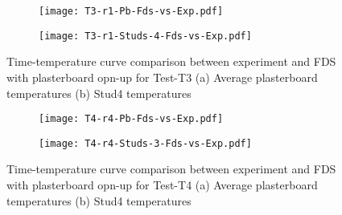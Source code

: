 \begin{figure}[!htbp]
	\centering
	\begin{subfigure}[b]{0.6\textwidth}
		\centering
		\texttt{[image: T3-r1-Pb-Fds-vs-Exp.pdf]}
		\caption{}
		\label{subfig:T3-r1-Pb-Fds-vs-Exp}
	\end{subfigure}
	\begin{subfigure}[b]{0.6\textwidth}
		\centering
		\texttt{[image: T3-r1-Studs-4-Fds-vs-Exp.pdf]}
		\caption{}
		\label{subfig:T3-r0-Studs-4-Fds-vs-Exp}
	\end{subfigure}
	   \caption{Time-temperature curve comparison between experiment and FDS with plasterboard opn-up for Test-T3 (a) Average plasterboard temperatures (b) Stud4 temperatures}
	   \label{fig:T3-fds-output-pbop}
\end{figure}
\begin{figure}[!htbp]
	\centering
	\begin{subfigure}[b]{0.6\textwidth}
		\centering
		\texttt{[image: T4-r4-Pb-Fds-vs-Exp.pdf]}
		\caption{}
		\label{subfig:T4-r4-Pb-Fds-vs-Exp}
	\end{subfigure}
	\begin{subfigure}[b]{0.6\textwidth}
		\centering
		\texttt{[image: T4-r4-Studs-3-Fds-vs-Exp.pdf]}
		\caption{}
		\label{subfig:T4-r4-Studs-3-Fds-vs-Exp}
	\end{subfigure}
	   \caption{Time-temperature curve comparison between experiment and FDS with plasterboard opn-up for Test-T4 (a) Average plasterboard temperatures (b) Stud4 temperatures}
	   \label{fig:T4-fds-output-pbop}
\end{figure}

